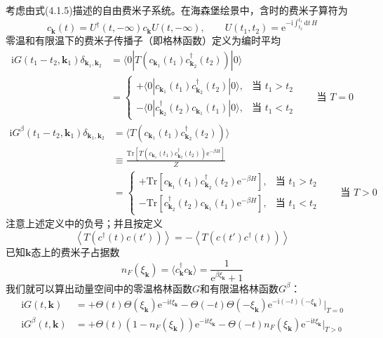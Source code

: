 考虑由式(4.1.5)描述的自由费米子系统。在海森堡绘景中，含时的费米子算符为
\begin{equation*}
c_{\pmb{k}}(t)=U^{\dagger}(t,-\infty)c_{\pmb{k}}U(t,-\infty),\qquad U(t_1,t_2)=\mathrm{e}^{-\mathrm{i}\int_{t_2}^{t_1}\mathrm{d}t\, H}
\end{equation*}
零温和有限温下的费米子传播子（即格林函数）定义为编时平均
\begin{align*}
\mathrm{i}G(t_1-t_2,\pmb{k}_1)\delta_{\pmb{k}_1,\pmb{k}_2}&=\langle 0|T(c_{\pmb{k}_1}(t_1)c_{\pmb{k}_2}^{\dagger}(t_2))|0\rangle\tag{4.2.1}\\
&=\begin{cases}
+\langle 0|c_{\pmb{k}_1}(t_1)c_{\pmb{k}_2}^{\dagger}(t_2)|0\rangle, & \text{当 } t_1>t_2\\
-\langle 0|c_{\pmb{k}_2}^{\dagger}(t_2)c_{\pmb{k}_1}(t_1)|0\rangle, & \text{当 } t_1<t_2
\end{cases}\qquad \text{当 } T=0
\end{align*}
\begin{align*}
\mathrm{i}G^{\beta}(t_1-t_2,\pmb{k}_1)\delta_{\pmb{k}_1,\pmb{k}_2}&=\langle T(c_{\pmb{k}_1}(t_1)c_{\pmb{k}_2}^{\dagger}(t_2))\rangle\\
&\equiv\frac{\mathrm{Tr}[T(c_{\pmb{k}_1}(t_1)c_{\pmb{k}_2}^{\dagger}(t_2))\mathrm{e}^{-\beta H}]}{Z}\tag{4.2.2}\\
&=\begin{cases}
+\mathrm{Tr}[c_{\pmb{k}_1}(t_1)c_{\pmb{k}_2}^{\dagger}(t_2)\mathrm{e}^{-\beta H}], & \text{当 } t_1>t_2\\
-\mathrm{Tr}[c_{\pmb{k}_2}^{\dagger}(t_2)c_{\pmb{k}_1}(t_1)\mathrm{e}^{-\beta H}], & \text{当 } t_1<t_2
\end{cases}\qquad \text{当 } T>0
\end{align*}
注意上述定义中的负号；并且按定义
\begin{equation*}
\left\langle T\left(c^{\dagger}(t)c(t')\right)\right\rangle=-\left\langle T\left(c(t')c^{\dagger}(t)\right)\right\rangle
\end{equation*}
已知$\pmb{k}$态上的费米子占据数
\begin{equation*}
n_F(\xi_{\pmb{k}})=\langle c_{\pmb{k}}^{\dagger}c_{\pmb{k}}\rangle=\frac{1}{\mathrm{e}^{\beta\xi_{\pmb{k}}}+1}
\end{equation*}
我们就可以算出动量空间中的零温格林函数$G$和有限温格林函数$G^{\beta}$：
\begin{align*}
\mathrm{i}G(t,\pmb{k})&=+\Theta(t)\Theta(\xi_{\pmb{k}})\mathrm{e}^{-\mathrm{i}t\xi_{\pmb{k}}}-\Theta(-t)\Theta(-\xi_{\pmb{k}})\mathrm{e}^{-\mathrm{i}(-t)(-\xi_{\pmb{k}})}\big|_{T=0}\\
\mathrm{i}G^{\beta}(t,\pmb{k})&=+\Theta(t)(1-n_F(\xi_{\pmb{k}}))\mathrm{e}^{-\mathrm{i}t\xi_{\pmb{k}}}-\Theta(-t)n_F(\xi_{\pmb{k}})\mathrm{e}^{-\mathrm{i}t\xi_{\pmb{k}}}\big|_{T>0}\tag{4.2.3}
\end{align*}
